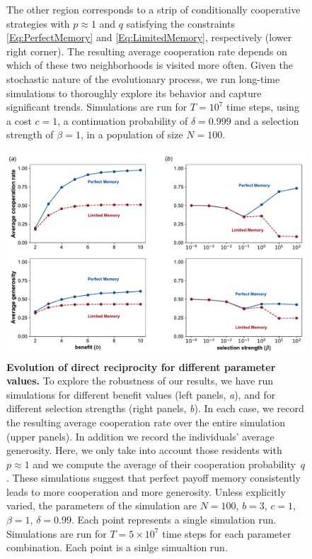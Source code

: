 \documentclass[11pt]{article}
\theoremstyle{plainCl1}
\theoremstyle{plainCl2}
\begin{document}
{\begin{figure}[t]
{    The other region corresponds to a strip of conditionally cooperative strategies with $p\!\approx\! 1$ and $q$ satisfying the constraints \eqref{Eq:PerfectMemory} and \eqref{Eq:LimitedMemory}, respectively (lower right corner). 
    The resulting average cooperation rate depends on which of these two neighborhoods is visited more often.
    Given the stochastic nature of the evolutionary process, we run long-time simulations to thoroughly explore its behavior and capture significant trends.
    Simulations are run for $T\!=\!10^7$ time steps, using a cost $c\!=\!1$, a continuation probability of $\delta\!=\!0.999$ and a selection strength of $\beta\!=\!1$, in a population of size $N\!=\!100$.}
\label{fig:expected_and_stochastic_for_donation}
\end{figure}


\clearpage
\newpage


\begin{figure}[t]
    \centering
    \includegraphics[width=.75\textwidth]{static/cooperation_rate_over_b_and_beta.pdf}
    \caption{{\bf Evolution of direct reciprocity for different parameter values.} 
    To explore the robustness of our results, we have run simulations for different benefit values (left panels, {\it a}), and for different selection strengths (right panels, {\it b}). 
    In each case, we record the resulting average cooperation rate over the entire simulation (upper panels). 
    In addition we record the individuals' average generosity. 
    Here, we only take into account those residents with $p\! \approx\! 1$ and we compute
    the average of their cooperation probability~$q$. 
    These simulations suggest that perfect payoff memory consistently leads to more cooperation and more generosity. 
    Unless explicitly varied, the parameters of the simulation are $N\!=\!100$, $b\!=\!3$, $c\!=\!1$, $\beta\!=\!1$, $\delta\!=\!0.99$.
    Each point represents a single simulation run. Simulations are run for $T\!=\!5\times 10^7$ time steps for each parameter combination. Each point is a sinlge simualtion run.}
    \label{fig:cooperation_rate_over_benefit_and_beta}
\end{figure}

}
\end{document}
